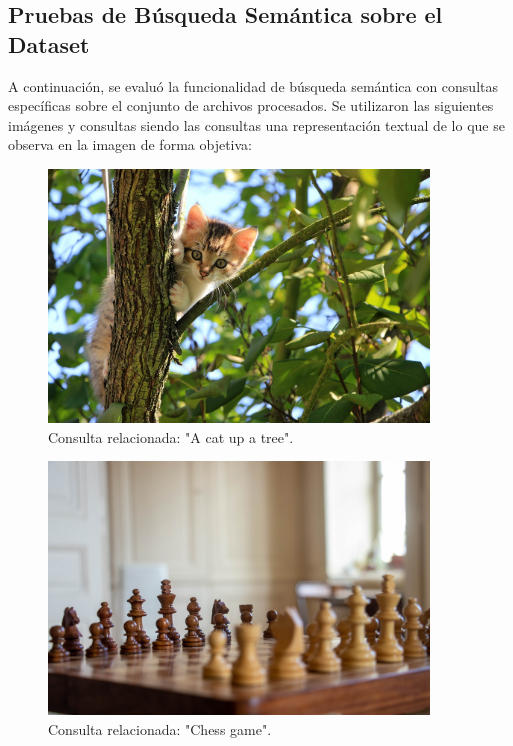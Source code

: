 \subsection{Pruebas de Búsqueda Semántica sobre el Dataset}

A continuación, se evaluó la funcionalidad de búsqueda semántica con consultas específicas sobre el conjunto de archivos procesados. Se utilizaron las siguientes imágenes y consultas siendo las consultas una representación textual de lo que se observa en la imagen de forma objetiva:

\begin{figure}[H]
\centering
\includegraphics[width=0.9\textwidth]{archivos/cat_example_image.png}
\caption[Imagen de un gato subido a un árbol]{Consulta relacionada: "A cat up a tree".}
\label{fig:search_cat_tree}
\end{figure}

\begin{figure}[H]
\centering
\includegraphics[width=0.9\textwidth]{archivos/chess_example_image.png}
\caption[Imagen de un tablero de ajedrez]{Consulta relacionada: "Chess game".}
\label{fig:search_chess}
\end{figure}


